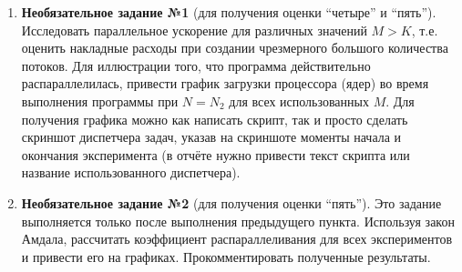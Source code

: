 \begin{enumerate}
     отчёт о проделанной работе.
		
     к устным вопросам на защите.
		
    \item\textbf{Необязательное задание №1} (для получения оценки ``четыре'' и ``пять''). Исследовать параллельное ускорение для различных значений $M > K$, т.е. оценить накладные расходы при создании чрезмерного большого количества потоков. Для иллюстрации того, что программа действительно распараллелилась, привести график загрузки процессора (ядер) во время выполнения программы при $N = N_2$ для всех использованных $M$. Для получения графика можно как написать скрипт, так и просто сделать скриншот диспетчера задач, указав на скриншоте моменты начала и окончания эксперимента (в отчёте нужно привести текст скрипта или название использованного диспетчера).
		
    \item\textbf{Необязательное задание №2} (для получения оценки ``пять''). Это задание выполняется только после выполнения предыдущего пункта. Используя закон Амдала, рассчитать коэффициент распараллеливания для всех экспериментов и привести его на графиках. Прокомментировать полученные результаты.
\end{enumerate}

